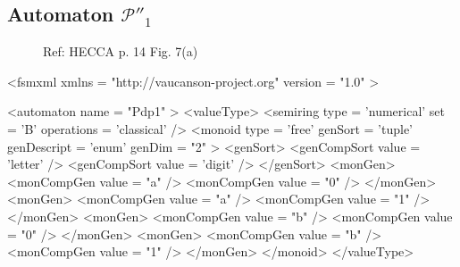 \subsection{Automaton $\mathcal{P}''_1$}
\label{automatonPdp1}

\begin{figure}[h]
  \begin{minipage}[c]{.66\textwidth}
    Ref: HECCA p. 14 Fig. 7(a)
  \end{minipage}
  \begin{minipage}[c]{.34\textwidth}

  \end{minipage}
\end{figure}

{\footnotesize 
\begin{listing}[5]{1}
<fsmxml  xmlns   = "http://vaucanson-project.org" 
         version = "1.0" > 

<automaton name = "Pdp1" >
  <valueType>
    <semiring  type       = 'numerical'
               set        = 'B'
               operations = 'classical' /> 
    <monoid    type       = 'free'
               genSort    = 'tuple' 
               genDescript = 'enum' 
	       genDim	  = "2" >
      <genSort>
         <genCompSort value = 'letter' />
         <genCompSort value = 'digit'  />
      </genSort>
      <monGen>
         <monCompGen value = "a" />
         <monCompGen value = "0" />
      </monGen>
      <monGen>
         <monCompGen value = "a" />
         <monCompGen value = "1" />
      </monGen>
      <monGen>
         <monCompGen value = "b" />
         <monCompGen value = "0" />
      </monGen>
      <monGen>
         <monCompGen value = "b" />
         <monCompGen value = "1" />
      </monGen>
    </monoid>
  </valueType>
\end{listing}
}

\newpage

